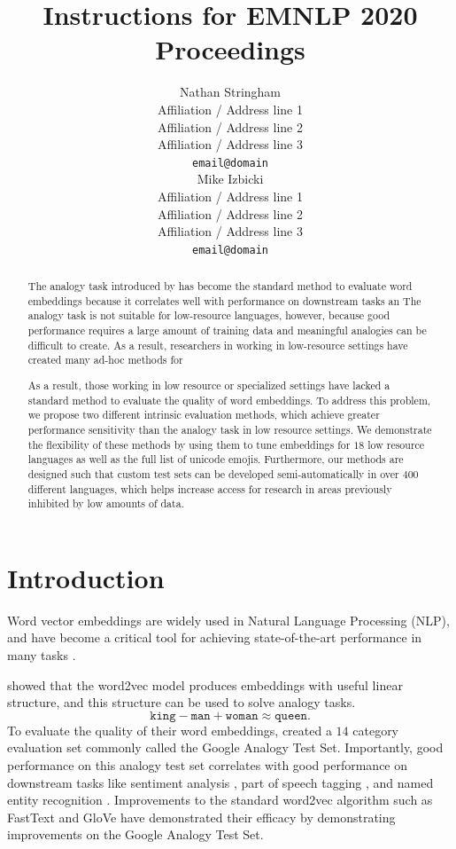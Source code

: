 \documentclass[11pt,a4paper]{article}
\title{Instructions for EMNLP 2020 Proceedings}
\author{Nathan Stringham\\
  Affiliation / Address line 1 \\
  Affiliation / Address line 2 \\
  Affiliation / Address line 3 \\
  \texttt{email@domain} \\\And
  Mike Izbicki \\
  Affiliation / Address line 1 \\
  Affiliation / Address line 2 \\
  Affiliation / Address line 3 \\
  \texttt{email@domain} \\}
\date{}
\begin{document}
\maketitle
\begin{abstract}
The analogy task introduced by \citet{mikolov2013efficient} has become the standard method to evaluate word embeddings because it correlates well with performance on downstream tasks an
The analogy task is not suitable for low-resource languages,
however, because good performance requires a large amount of training data and meaningful analogies can be difficult to create.
As a result, researchers in working in low-resource settings have created many ad-hoc methods for 

 As a result, those working in low resource or specialized settings have lacked a standard method to evaluate the quality of word embeddings.
 To address this problem, we propose two different intrinsic evaluation methods, which achieve greater performance sensitivity than the analogy task in low resource settings.
  We demonstrate the flexibility of these methods by using them to tune embeddings for $18$ low resource languages as well as the full list of unicode emojis.
   Furthermore, our methods are designed such that custom test sets can be developed semi-automatically in over $400$ different languages, which helps increase access for research in areas previously inhibited by low amounts of data.
\end{abstract}


\section{Introduction}
\label{sec:intro}

Word vector embeddings are widely used in Natural Language Processing (NLP),
and have become a critical tool for achieving state-of-the-art performance in many tasks \cite{}.

\citet{mikolov2013efficient} showed that the word2vec model produces embeddings with useful linear structure, and this structure can be used to solve analogy tasks.
\begin{equation}
\texttt{king} - \texttt{man} + \texttt{woman} \approx \texttt{queen}
.
\end{equation}
To evaluate the quality of their word embeddings,
\citet{mikolov2013efficient} created a $14$ category evaluation set commonly called the Google Analogy Test Set. 
Importantly, good performance on this analogy test set correlates with good performance on downstream tasks like sentiment analysis \cite{}, part of speech tagging \cite{}, and named entity recognition \cite{}.
Improvements to the standard word2vec algorithm such as FastText \cite{bojanowski2016enriching} and GloVe \cite{pennington2014glove} have demonstrated their efficacy by demonstrating improvements on the Google Analogy Test Set.
\end{document}
